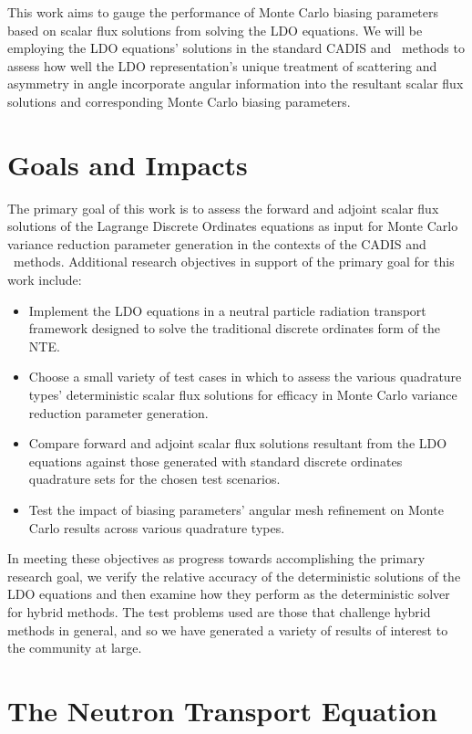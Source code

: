 This work aims to gauge the performance of Monte Carlo biasing parameters based on
scalar flux solutions from solving the LDO equations. We will be employing the LDO equations'
solutions in the standard CADIS and \fwc\ methods to assess how well the LDO representation's
unique treatment of scattering and asymmetry in angle incorporate angular information into the
resultant scalar flux solutions and corresponding Monte Carlo biasing parameters.

\section{Goals and Impacts}
\label{goals}

The primary goal of this work is to assess the forward and adjoint scalar flux 
solutions of the Lagrange Discrete Ordinates equations as input for Monte Carlo 
variance reduction parameter generation in the contexts of the CADIS and \fwc\ methods.
Additional research objectives in support of the primary goal for this work include:

\begin{itemize}
\item{Implement the LDO equations in a neutral particle radiation transport framework 
      designed to solve the traditional discrete ordinates form of the NTE.}
\item{Choose a small variety of test cases in which to assess the various quadrature
      types' deterministic scalar flux solutions for efficacy in Monte Carlo variance reduction 
      parameter generation.}
\item{Compare forward and adjoint scalar flux solutions resultant from the LDO
      equations against those generated with standard discrete ordinates quadrature
      sets for the chosen test scenarios.}
\item{Test the impact of biasing parameters' angular mesh refinement on Monte Carlo results
      across various quadrature types.}
\end{itemize}

\noindent In meeting these objectives as progress towards accomplishing the primary research goal,
we verify the relative accuracy of the deterministic solutions of the LDO equations and then 
examine how they perform as the deterministic solver for hybrid methods. The test problems used 
are those that challenge hybrid methods in general, and so we have generated
a variety of results of interest to the community at large.

\section{The Neutron Transport Equation}
\label{sec:nte}

